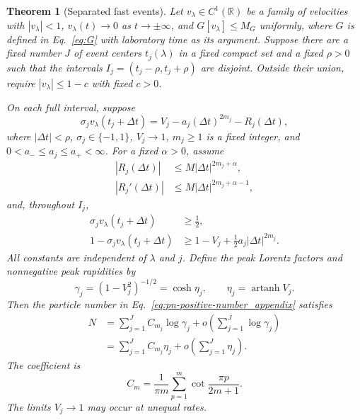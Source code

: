 \documentclass[11pt]{article}
\newcommand{\R}{\mathbb R}
\newcommand{\atanh}{\operatorname{artanh}}
\newtheorem{theorem}{Theorem}
\begin{document}
\begin{theorem}[Separated fast events]
\label{thm:local}
Let $v_\lambda\in C^1(\R)$ be a family of velocities with
$|v_\lambda|<1$, $v_\lambda(t)\to0$ as $t\to\pm\infty$, and
$G[v_\lambda]\le M_G$ uniformly, where $G$ is defined in
Eq.~\eqref{eq:G} with laboratory time as its argument.
Suppose there are a fixed number $J$ of event centers
$t_j(\lambda)$ in a fixed compact set and a fixed $\rho>0$ such that
the intervals $I_j=(t_j-\rho,t_j+\rho)$ are disjoint. Outside their
union, require $|v_\lambda|\le1-c$ with fixed $c>0$.

On each full interval, suppose
\begin{equation}
 \sigma_j v_\lambda(t_j+\Delta t)
 =V_j-a_j(\Delta t)^{2m_j}-R_j(\Delta t),
 \label{eq:profile}
\end{equation}
where $|\Delta t|<\rho$, $\sigma_j\in\{-1,1\}$,
$V_j\to1$, $m_j\ge1$ is a fixed integer, and
$0<a_-\le a_j\le a_+<\infty$. For a fixed $\alpha>0$, assume
\begin{equation}
 \begin{aligned}
 |R_j(\Delta t)|&\le M|\Delta t|^{2m_j+\alpha},\\
 |R_j'(\Delta t)|&\le M|\Delta t|^{2m_j+\alpha-1},
 \end{aligned}
 \label{eq:remainders}
\end{equation}
and, throughout $I_j$,
\begin{equation}
 \begin{aligned}
 \sigma_j v_\lambda(t_j+\Delta t)&\ge\tfrac12,\\
 1-\sigma_j v_\lambda(t_j+\Delta t)
     &\ge1-V_j+\tfrac12a_j|\Delta t|^{2m_j}.
 \end{aligned}
 \label{eq:coercive}
\end{equation}
All constants are independent of $\lambda$ and $j$. Define the peak
Lorentz factors and nonnegative peak rapidities by
\begin{equation}
 \gamma_j=(1-V_j^2)^{-1/2}=\cosh\eta_j,
 \qquad \eta_j=\atanh V_j.
 \label{eq:local-heights}
\end{equation}
Then the particle number in Eq.~\eqref{eq:pn-positive-number_appendix}
satisfies
\begin{align}
 N&=\sum_{j=1}^J C_{m_j}\log\gamma_j
       +o\!\left(\sum_{j=1}^J\log\gamma_j\right)\nonumber\\
  &=\sum_{j=1}^J C_{m_j}\eta_j
       +o\!\left(\sum_{j=1}^J\eta_j\right).
 \label{eq:localN}
\end{align}
The coefficient is
\begin{equation}
 C_m=\frac1{\pi m}\sum_{p=1}^m\cot\frac{\pi p}{2m+1}.
 \label{eq:Cm}
\end{equation}
The limits $V_j\to1$ may occur at unequal rates.


\end{theorem}
\end{document}
